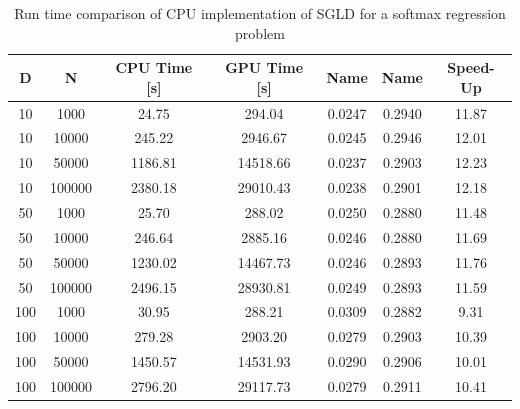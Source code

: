 \documentclass[9pt,lineno]{crone}
\begin{document}
\begin{table}[h]
	\centering
	\begin{tabular}{|c|c|c|c|c|c|c|}
		\hline 
		D & N & CPU Time [s] & GPU Time [s] & Name & Name & Speed-Up\\ 
		\hline 		
10	& 1000& 	24.75& 294.04  & 0.0247& 0.2940& 11.87\\
10	& 10000& 	245.22& 2946.67	& 0.0245& 0.2946& 12.01\\
10	& 50000& 	1186.81& 14518.66 & 0.0237& 0.2903& 12.23\\
10	& 100000	& 2380.18& 29010.43	& 0.0238& 0.2901& 12.18\\
\hline
50	& 1000	& 25.70& 288.02	& 0.0250& 0.2880& 11.48\\
50	& 10000	& 246.64& 2885.16	& 0.0246& 0.2880& 11.69\\
50	& 50000	& 1230.02& 14467.73	& 0.0246& 0.2893& 11.76\\
50 & 	100000	& 2496.15& 28930.81	& 0.0249& 0.2893& 11.59\\
\hline
100	& 1000	& 30.95& 288.21	& 0.0309& 0.2882& 9.31\\
100	& 10000	& 279.28& 2903.20& 0.0279& 0.2903& 10.39\\
100	& 50000	& 1450.57& 14531.93& 0.0290& 0.2906& 10.01\\
100	& 100000& 	2796.20& 29117.73& 0.0279& 0.2911& 10.41\\

		\hline 
\end{tabular}
\caption{Run time comparison of CPU implementation of SGLD for a softmax regression problem}
\label{tab:sgld} 
\end{table}


\end{document}
